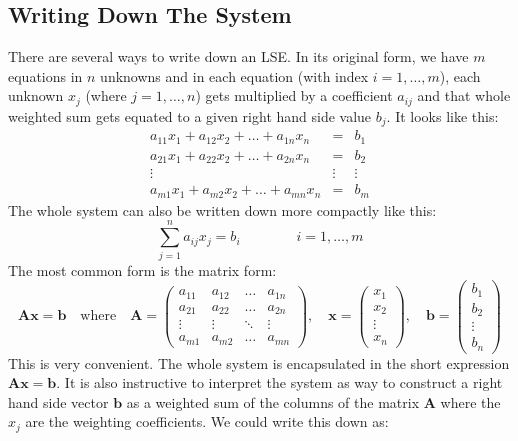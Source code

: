 \subsection{Writing Down The System}
There are several ways to write down an LSE. In its original form, we have  $m$ equations in $n$ unknowns and in each equation (with index $i = 1,\ldots, m$), each unknown $x_j$ (where $j=1,\ldots,n$) gets multiplied by a coefficient $a_{ij}$ and that whole weighted sum gets equated to a given right hand side value $b_j$. It looks like this:
\begin{eqnarray}
a_{11} x_1 + a_{12} x_2 + \ldots + a_{1n} x_n &=& b_1    \\
a_{21} x_1 + a_{22} x_2 + \ldots + a_{2n} x_n &=& b_2    \\
                                       \vdots &\vdots& \vdots \\
a_{m1} x_1 + a_{m2} x_2 + \ldots + a_{mn} x_n &=& b_m 
\end{eqnarray}
The whole system can also be written down more compactly like this:
\begin{equation}
\sum_{j=1}^n a_{ij} x_j = b_i \qquad \qquad i=1, \ldots, m
\end{equation}
The most common form is the matrix form:
\begin{equation}
\mathbf{A x} = \mathbf{b} \quad \text{where} \quad
\mathbf{A} = 
\begin{pmatrix}
a_{11} & a_{12} & \ldots & a_{1n} \\
a_{21} & a_{22} & \ldots & a_{2n} \\ 
\vdots & \vdots & \ddots & \vdots \\
a_{m1} & a_{m2} & \ldots & a_{mn} 
\end{pmatrix}, \quad
\mathbf{x} = 
\begin{pmatrix}
x_{1} \\
x_{2} \\ 
\vdots\\
x_{n} 
\end{pmatrix}, \quad
\mathbf{b} = 
\begin{pmatrix}
b_{1} \\
b_{2} \\ 
\vdots\\
b_{n} 
\end{pmatrix}
\end{equation}
This is very convenient. The whole system is encapsulated in the short expression $\mathbf{A x} = \mathbf{b}$. It is also instructive to interpret the system as way to construct a right hand side vector $\mathbf{b}$ as a weighted sum of the columns of the matrix $\mathbf{A}$ where the $x_j$ are the weighting coefficients. We could write this down as:
